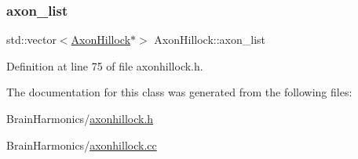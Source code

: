 \subsubsection{\texorpdfstring{axon\+\_\+list}{axon\_list}}
{\footnotesize\ttfamily std\+::vector$<$\hyperlink{class_axon_hillock}{Axon\+Hillock}$\ast$$>$ Axon\+Hillock\+::axon\+\_\+list\hspace{0.3cm}{\ttfamily [protected]}}



Definition at line 75 of file axonhillock.\+h.



The documentation for this class was generated from the following files\+:\begin{DoxyCompactItemize}
\item 
Brain\+Harmonics/\hyperlink{axonhillock_8h}{axonhillock.\+h}\item 
Brain\+Harmonics/\hyperlink{axonhillock_8cc}{axonhillock.\+cc}\end{DoxyCompactItemize}
